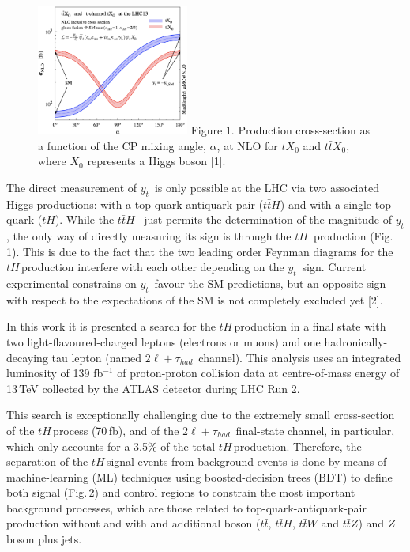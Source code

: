 \documentclass[a4paper,10pt]{article}
\newcommand{\yt}{\ensuremath{y_{t}}}
\newcommand{\ttbar}{\ensuremath{t\bar{t}}}
\newcommand{\ttH}{\ensuremath{t\bar{t}H}}
\newcommand{\tH}{\ensuremath{tH}}
\newcommand{\tHq}{\tH}
\newcommand{\dileptau}{\ensuremath{2\ell+\tau_{had}}}
\begin{document}
\begin{figure}
	\includegraphics[width=5cm]{xsec_vs_yt_tH_ttH}
	{\footnotesize Figure 1. Production cross-section as a function of the CP mixing angle,
	$\alpha$, at NLO for $tX_{0}$ and $t\bar{t}X_{0}$, where $X_{0}$ represents a Higgs boson [1].}
\end{figure} 

The direct measurement of \yt$\,$ is only possible at the LHC via two associated
Higgs productions: with a top-quark-antiquark pair (\ttH) and with a single-top quark (\tHq). While the \ttH  
$\,$ just permits the determination of the magnitude of \yt, the only way of directly 
measuring its sign is through the \tHq$\,$ production (Fig.$\,$1). This is due to the fact that the two leading order 
Feynman diagrams for the \tHq$\,$production interfere with each other depending on the \yt$\,$ sign. 
Current experimental constrains on \yt$\,$ favour the SM predictions, but an opposite sign with 
respect to the expectations of the SM is not completely excluded yet [2].

In this work it is presented a search for the \tHq$\,$production in a final state with two light-flavoured-charged 
leptons (electrons or muons) and one hadronically-decaying tau lepton (named \dileptau$\,$ channel).
This analysis uses an integrated luminosity of 139 fb$^{-1}$ of proton-proton collision data at 
centre-of-mass energy of 13$\,$TeV collected by the ATLAS detector during LHC Run 2. 

This search is exceptionally challenging due to the extremely small cross-section of the \tHq$\,$process
(70$\,$fb), and of the \dileptau$\,$ final-state channel, in particular, which only accounts 
for a 3.5\% of the total \tHq$\,$production.
Therefore, the separation of the \tHq$\,$signal events from background events is done by means of 
machine-learning (ML) techniques using boosted-decision trees (BDT) to
define both signal (Fig.$\,$2) and control regions to constrain the most important background processes,
 which are those related
to top-quark-antiquark-pair production without and with and additional boson
(\ttbar, $t\bar{t}H$, $t\bar{t}W$ and $t\bar{t}Z$) and $Z$ boson plus jets.
\end{document}
